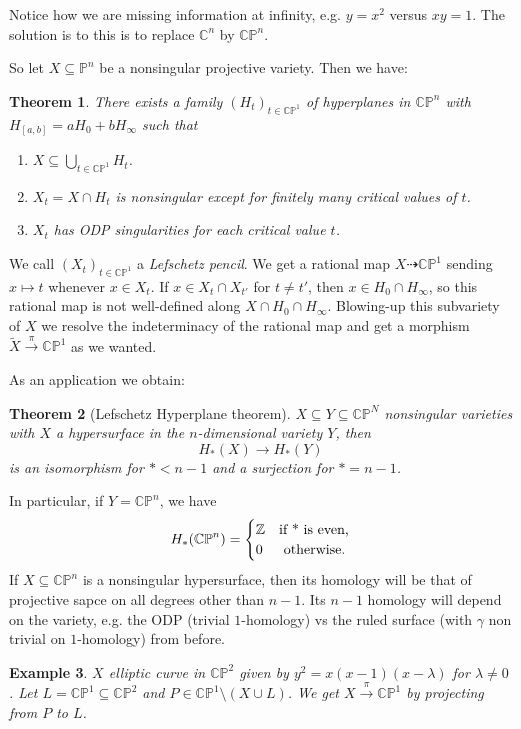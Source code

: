 \documentclass[12pt]{article}
\theoremstyle{darkgreentheorem}
\newtheorem{thm}{Theorem}[section]
\theoremstyle{darkbluedefinition}
\theoremstyle{darkredexample}
\newtheorem{exa}[thm]{Example}
\theoremstyle{remark}
\newcommand{\Z}{\mathbb{Z}}
\newcommand{\1}{\mathbbm{1}}
\newcommand{\C}{\mathbb{C}}
\newcommand{\CP}{\mathbb{CP}}
\begin{document}
Notice how we are missing information at infinity, e.g. $y=x^{2}$ versus $xy=1$.
The solution is to this is to replace $\C^{n}$ by $\CP^{n}$.

So let $X\subseteq\mathbb{P}^{n}$ be a nonsingular projective variety.
Then we have:

\begin{thm}
    There exists a family $(H_{t})_{t\in \CP^{1}}$ of hyperplanes in $\CP^{n}$ with $H_{[a,b]}=aH_{0}+bH_{\infty}$ such that
    \begin{enumerate}
	\item $X\subseteq \bigcup_{t\in \CP^{1}}H_{t}$.
	\item $X_{t}=X\cap H_{t}$ is nonsingular except for finitely many critical values of $t$.
	\item $X_{t}$ has ODP singularities for each critical value $t$.
    \end{enumerate}
\end{thm}

We call $(X_{t})_{t\in \CP^{1}}$ a \textit{Lefschetz pencil}.
We get a rational map $X\dashrightarrow \CP^{1}$ sending $x\mapsto t$ whenever $x\in X_{t}$.
If $x\in X_{t}\cap X_{t'}$ for $t\neq t'$, then $x\in H_{0}\cap H_{\infty}$, so this rational map is not well-defined along $X\cap H_{0}\cap H_{\infty}$.
Blowing-up this subvariety of $X$ we resolve the indeterminacy of the rational map and get a morphism $\tilde{X}\xrightarrow{\pi} \CP^{1}$ as we wanted.

As an application we obtain:

\begin{thm}[Lefschetz Hyperplane theorem]
    $X\subseteq Y\subseteq \CP^{N}$ nonsingular varieties with $X$ a hypersurface in the $n$-dimensional variety $Y$, then
    \[ H_{*}(X)\to H_{*}(Y) \]
    is an isomorphism for $*<n-1$ and a surjection for $*=n-1$.
\end{thm}

In particular, if $Y=\CP^{n}$, we have
\[ H_{*}(\CP^{n})=\begin{cases} \Z & \text{if } $*$ \text{ is even,} \\ 0 & \text{ otherwise.} \end{cases}\]
If $X\subseteq \CP^{n}$ is a nonsingular hypersurface, then its homology will be that of projective sapce on all degrees other than $n-1$.
Its $n-1$ homology will depend on the variety, e.g. the ODP (trivial $1$-homology) vs the ruled surface (with $\gamma$ non trivial on $1$-homology) from before.

\begin{exa}
    $X$ elliptic curve in $\CP^{2}$ given by $y^{2}=x(x-1)(x-\lambda)$ for $\lambda\neq 0$.
    Let $L=\CP^{1}\subseteq \CP^{2}$ and $P\in \CP^{1}\setminus (X\cup L)$.
    We get $X\xrightarrow{\pi}\CP^{1}$ by projecting from $P$ to $L$.
\end{exa}
\end{document}
